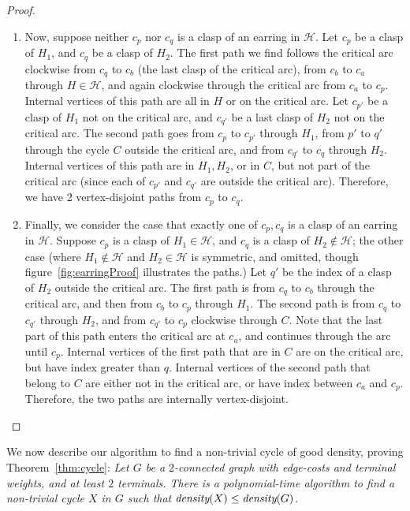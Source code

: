 \documentclass[11pt]{article}
\newcommand{\dens}[1]{\emph{density}(#1)}
\newcommand{\script}[1]{\mathcal{#1}}
\begin{document}
\begin{proof}
\begin{enumerate}
  \item Now, suppose neither $c_p$ nor $c_q$ is a clasp of an earring
    in $\script{H}$. Let $c_p$ be a clasp of $H_1$, and $c_q$ be a
    clasp of $H_2$. The first path we find follows the critical arc
    clockwise from $c_q$ to $c_b$ (the last clasp of the critical
    arc), from $c_b$ to $c_a$ through $H \in \script{H}$, and again
    clockwise through the critical arc from $c_a$ to $c_p$. Internal
    vertices of this path are all in $H$ or on the critical arc. Let
    $c_{p'}$ be a clasp of $H_1$ not on the critical arc, and $c_{q'}$
    be a last clasp of $H_2$ not on the critical arc. The second path
    goes from $c_p$ to $c_{p'}$ through $H_1$, from $p'$ to $q'$
    through the cycle $C$ outside the critical arc, and from $c_{q'}$
    to $c_q$ through $H_2$. Internal vertices of this path are in
    $H_1, H_2$, or in $C$, but not part of the critical arc (since
    each of $c_{p'}$ and $c_{q'}$ are outside the critical arc).
    Therefore, we have 2 vertex-disjoint paths from $c_p$ to $c_q$.


  \item Finally, we consider the case that exactly one of $c_p, c_q$
    is a clasp of an earring in $\script{H}$. Suppose $c_p$ is a clasp
    of $H_1 \in \script{H}$, and $c_q$ is a clasp of $H_2 \notin
    \script{H}$; the other case (where $H_1 \notin \script{H}$ and
    $H_2 \in \script{H}$ is symmetric, and omitted, though
    figure~\ref{fig:earringProof} illustrates the paths.) Let $q'$ be
    the index of a clasp of $H_2$ outside the critical arc. The first
    path is from $c_q$ to $c_b$ through the critical arc, and then
    from $c_b$ to $c_p$ through $H_1$. The second path is from $c_q$
    to $c_{q'}$ through $H_2$, and from $c_{q'}$ to $c_p$ clockwise
    through $C$. Note that the last part of this path enters the
    critical arc at $c_a$, and continues through the arc until $c_p$.
    Internal vertices of the first path that are in $C$ are on the
    critical arc, but have index greater than $q$. Internal vertices
    of the second path that belong to $C$ are either not in the
    critical arc, or have index between $c_a$ and $c_p$. Therefore,
    the two paths are internally vertex-disjoint. \qedhere
  \end{enumerate}
\end{proof}

We now describe our algorithm to find a non-trivial cycle of good
density, proving Theorem~\ref{thm:cycle}:
  \emph{Let $G$ be a $2$-connected graph with edge-costs and terminal weights,
  and at least $2$ terminals. There is a polynomial-time algorithm to
  find a non-trivial cycle $X$ in $G$ such that $\dens{X} \le
  \dens{G}$.}
\end{document}
